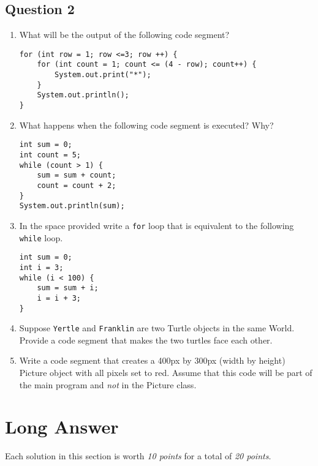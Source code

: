 \documentclass[12pt]{report}
\newcommand{\AnsBox}[1]{
\hspace{-1cm}\fbox{
\begin{minipage}[b][#1][c]{17.6cm}
\hfill
\end{minipage}}
}
\begin{document}
\subsection*{Question 2}
\begin{enumerate}
\item What will be the output of the following code segment?
\begin{verbatim}
for (int row = 1; row <=3; row ++) {
    for (int count = 1; count <= (4 - row); count++) {
        System.out.print("*");
    }
    System.out.println();
}
\end{verbatim}
\AnsBox{5cm}
\item What happens when the following code segment is executed? Why?
\begin{verbatim}
int sum = 0;
int count = 5;
while (count > 1) {
    sum = sum + count;
    count = count + 2;
}
System.out.println(sum);
\end{verbatim}
\AnsBox{5cm}
\clearpage

\item In the space provided write a \texttt{for} loop that is equivalent to the following \texttt{while} loop.
\begin{verbatim}
int sum = 0;
int i = 3;
while (i < 100) {
    sum = sum + i;
    i = i + 3;
}
\end{verbatim}
\AnsBox{8cm}


\item Suppose \texttt{Yertle} and \texttt{Franklin} are two Turtle objects in the same World. Provide a code segment that makes the two turtles face each other.

\AnsBox{8cm}

\item Write a code segment that creates a 400px by 300px (width by height) Picture object with all pixels set to red. Assume that this code will be part of the main program and \emph{not} in the Picture class.

\AnsBox{12cm}

\end{enumerate}

\clearpage
\section*{Long Answer}
Each solution in this section is worth \emph{10 points} for a total of \emph{20 points}.
\end{document}
